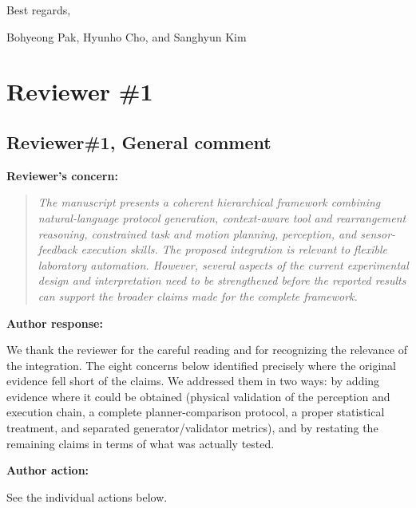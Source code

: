 \documentclass[11pt]{article}
\newif\ifshowstatus
\newcommand{\statusline}[2]{\ifshowstatus\par\noindent\textcolor{status#1}{\textbf{Status: \MakeUppercase{#1}.} #2}\par\smallskip\fi}
\newcommand{\reviewer}[1]{\clearpage\section*{#1}}
\newenvironment{concern}[3][pending]{\subsection*{\ifshowstatus\textcolor{status#1}{#2}\else#2\fi}\statusline{#1}{#3}\textbf{Reviewer's concern:}\begin{quote}\itshape}{\end{quote}}
\newenvironment{response}{\textbf{Author response:}\par\smallskip}{\par\medskip}
\newenvironment{action}{\textbf{Author action:}\par\smallskip}{\par\bigskip\noindent\hrulefill\par\bigskip}
\begin{document}
Best regards,

Bohyeong Pak, Hyunho Cho, and Sanghyun Kim

\ifshowstatus
\bigskip\noindent\fbox{\parbox{\dimexpr\linewidth-2\fboxsep-2\fboxrule}{\small
\textbf{Reading guide (internal; disappears when \texttt{\string\showstatusfalse} is set in the preamble).}
A \textcolor{statuscomplete}{\textbf{blue heading}} marks a concern whose response is complete and needs no further data.
A \textcolor{statuspending}{\textbf{red heading}} marks a concern that still depends on pending experiments, re-analyses, or configuration values; its Status line names the items in \texttt{HARDWARE.md} (A = hardware, B = simulation/offline, C = values from lab records).
\textcolor{red}{Red inline text} marks placeholder values that must be replaced by measurements before submission.}}
\fi

\reviewer{Reviewer \#1}

\begin{concern}[complete]{Reviewer\#1, General comment}{Umbrella response; nothing pending.}
The manuscript presents a coherent hierarchical framework combining natural-language protocol generation, context-aware tool and rearrangement reasoning, constrained task and motion planning, perception, and sensor-feedback execution skills.
The proposed integration is relevant to flexible laboratory automation.
However, several aspects of the current experimental design and interpretation need to be strengthened before the reported results can support the broader claims made for the complete framework.
\end{concern}

\begin{response}
We thank the reviewer for the careful reading and for recognizing the relevance of the integration.
The eight concerns below identified precisely where the original evidence fell short of the claims.
We addressed them in two ways: by adding evidence where it could be obtained (physical validation of the perception and execution chain, a complete planner-comparison protocol, a proper statistical treatment, and separated generator/validator metrics), and by restating the remaining claims in terms of what was actually tested.
\end{response}

\begin{action}
See the individual actions below.
\end{action}
\end{document}
